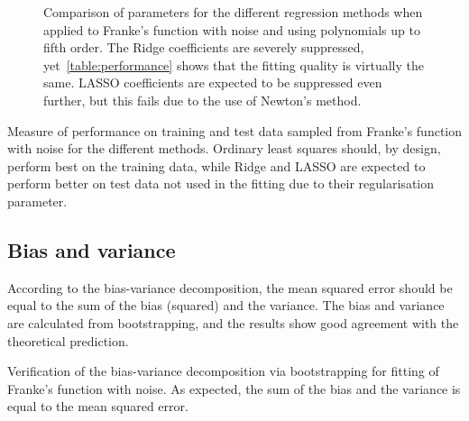 \documentclass[11pt,british,a4paper]{article}
\numberwithin{equation}{section}
\begin{document}
\begin{figure}[H]
    \centering
    \caption{Comparison of parameters for the different regression methods when applied to Franke's function with noise and using polynomials up to fifth order. The Ridge coefficients are severely suppressed, yet~\vref{table:performance} shows that the fitting quality is virtually the same. LASSO coefficients are expected to be suppressed even further, but this fails due to the use of Newton's method.}
\end{figure}

\begin{table}[H]
    \centering
    \caption{Measure of performance on training and test data sampled from Franke's function with noise for the different methods. Ordinary least squares should, by design, perform best on the training data, while Ridge and LASSO are expected to perform better on test data not used in the fitting due to their regularisation parameter.}\label{table:performance}
\end{table}

\subsection{Bias and variance}
According to the bias-variance decomposition, the mean squared error should be equal to the sum of the bias (squared) and the variance.
The bias and variance are calculated from bootstrapping, and the results show good agreement with the theoretical prediction.
\begin{table}[H]
    \centering
    \caption{Verification of the bias-variance decomposition via bootstrapping for fitting of Franke's function with noise. As expected, the sum of the bias and the variance is equal to the mean squared error.}
\end{table}









\clearpage
\nocite{*}
\printbibliography{}
\end{document}
